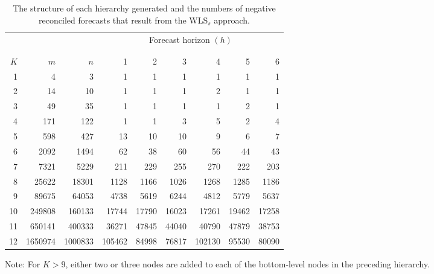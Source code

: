 \documentclass[twocolumn]{svjour3}
\begin{document}
\begin{table*}[!htb]
	\caption{The structure of each hierarchy generated and the numbers of negative reconciled forecasts that result from the WLS$_{s}$ approach.}
	\label{tbl:negstrwls}
	\centering
	\begin{threeparttable}
		\begin{tabular}{rrrrrrrrr}
			\toprule
			&         &         & \multicolumn{6}{c}{Forecast horizon $(h)$}                                          \\[-0.3cm]\\\cline{4-9}\\[-0.3cm]
			$K$ & $m$     & $n$     & 1  & 2     & 3     & 4      & 5     & 6     \\
			\midrule
			1   & 4       & 3       & 1  & 1     & 1     & 1      & 1     & 1     \\
			2   & 14      & 10      & 1  & 1     & 1     & 2      & 1     & 1     \\
			3   & 49      & 35      & 1  & 1     & 1     & 1      & 2     & 1     \\
			4   & 171     & 122     & 1  & 1     & 3     & 5      & 2     & 4     \\
			5   & 598     & 427     & 13 & 10    & 10    & 9      & 6     & 7     \\
			6   & 2092    & 1494    & 62 & 38    & 60    & 56     & 44    & 43    \\
			7   & 7321    & 5229    & 211  & 229   & 255   & 270    & 222   & 203   \\
			8   & 25622   & 18301   & 1128 & 1166  & 1026  & 1268   & 1285  & 1186  \\
			9   & 89675   & 64053   & 4738 & 5619  & 6244  & 4812   & 5779  & 5637  \\
			10  & 249808  & 160133  & 17744 & 17790 & 16023 & 17261  & 19462 & 17258 \\
			11  & 650141  & 400333  & 36271 & 47845 & 44040 & 40790  & 47879 & 38753 \\
			12  & 1650974 & 1000833 & 105462 & 84998 & 76817 & 102130 & 95530 & 80090 \\
			\bottomrule
		\end{tabular}
		\begin{tablenotes}
			\item [] Note: For $K > 9$, either two or three nodes are added to each of the bottom-level nodes in the preceding hierarchy.
		\end{tablenotes}
	\end{threeparttable}
\end{table*}
\end{document}
